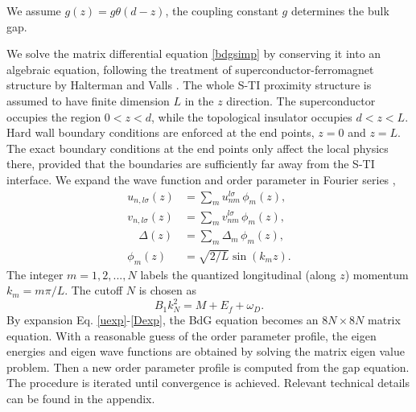 \documentclass[12pt,twocolumn]{article}
\begin{document}
We assume $g(z)=g\theta(d-z)$, the coupling constant $g$ determines the bulk gap.


We solve the matrix differential equation \eqref{bdgsimp} by conserving it into an algebraic equation, 
following the treatment of superconductor-ferromagnet structure by 
Halterman and Valls \cite{h-v}. The whole S-TI proximity structure is assumed to have 
finite dimension $L$ in the $z$
direction. The superconductor occupies the region $0<z<d$,
while the topological insulator occupies $d<z<L$. Hard wall boundary conditions are enforced at the end points, 
$z=0$ and $z=L$.  
The exact boundary conditions at the end points only affect the local physics there, provided 
that the boundaries are sufficiently far away from the S-TI interface. We expand the wave function
and order parameter in Fourier series \cite{h-v},
\begin{eqnarray}
u_{n,l\sigma}(z) &= \sum_m u_{nm}^{l \sigma}\,\phi_m(z),\label{uexp}\\ 
v_{n,l\sigma}(z) &= \sum_m v_{nm}^{l \sigma}\, \phi_m(z),\\
\quad \Delta(z) &= \sum_m \Delta_{m}\, \phi_m(z) , \label{Dexp}\\
\phi_m(z)&=\sqrt{2/L}\sin(k_m z).
\end{eqnarray}
The integer $m=1,2,...,N$ labels the quantized longitudinal (along $z$) momentum $k_m=m\pi/L$. 
The cutoff $N$ is chosen as \cite{s-v}
\begin{equation}
B_1k^2_N=M+E_f+\omega_D. \label{eq-N}
\end{equation}
By expansion Eq. \eqref{uexp}-\eqref{Dexp}, the BdG equation
becomes an $8N \times 8N$ matrix equation. With a reasonable guess of the order parameter profile, 
the eigen energies and eigen wave functions are obtained by solving the matrix eigen value problem.
Then a new order parameter profile is computed from the gap equation. The procedure is iterated
until convergence is achieved.  Relevant technical details can be found
in the appendix. 
\end{document}
